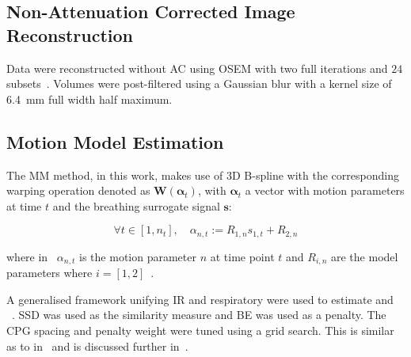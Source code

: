             \subsection{Non-Attenuation Corrected Image Reconstruction} \label{sec:pet_ct_respiratory_motion_correction_with_a_single_attenuation_map_using_nac_derived_deformation_fields_methods_non-attenuation_corrected_image_reconstruction}
                Data were reconstructed without \gls{AC} using \gls{OSEM} with two full iterations and $24$ subsets~.
                Volumes were post-filtered using a Gaussian blur with a kernel size of \SI{6.4}{\milli\metre} full width half maximum.
            
            \subsection{Motion Model Estimation} \label{sec:pet_ct_respiratory_motion_correction_with_a_single_attenuation_map_using_nac_derived_deformation_fields_methods_motion_model_estimation}
                The \gls{MM} method, in this work, makes use of \gls{3D} B-spline  with the corresponding warping operation denoted as $\mathbf{W}(\mathbf{\alpha}_t)$, with $\mathbf{\alpha}_t$ a vector with motion parameters at time $t$ and the breathing surrogate signal $\mathbf{s}$:
                
                \begin{equation} \label{eq:pet_ct_respiratory_motion_correction_with_a_single_attenuation_map_using_nac_derived_deformation_fields_methods_motion_parameters}
                    \forall t \in [1, n_t],\quad \alpha_{n, t} := R_{1, n} s_{1, t} + R_{2, n}
                \end{equation}
                
                \noindent where in~ $\alpha_{n, t}$ is the motion parameter $n$ at time point $t$ and $R_{i, n}$ are the model parameters where $i = [1, 2]$~.
                
                A generalised framework unifying \gls{IR} and respiratory  were used to estimate  and ~. \gls{SSD} was used as the similarity measure and \gls{BE} was used as a penalty. The \gls{CPG} spacing and penalty weight were tuned using a grid search. This is similar as to in~ and is discussed further in~.
            
